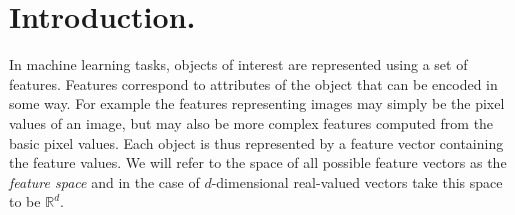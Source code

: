 









\section{Introduction.}

In machine learning tasks, objects of interest are represented using a set of features. Features correspond to attributes of the object that can be encoded in some way. For example the features representing images may simply be the pixel values of an image, but may also be more complex features computed from the basic pixel values. Each object is thus represented by a feature vector containing the feature values. We will refer to the space of all possible feature vectors as the \emph{feature space} and in the case of $d$-dimensional real-valued vectors take this space to be $\mathbb{R}^d$. 

